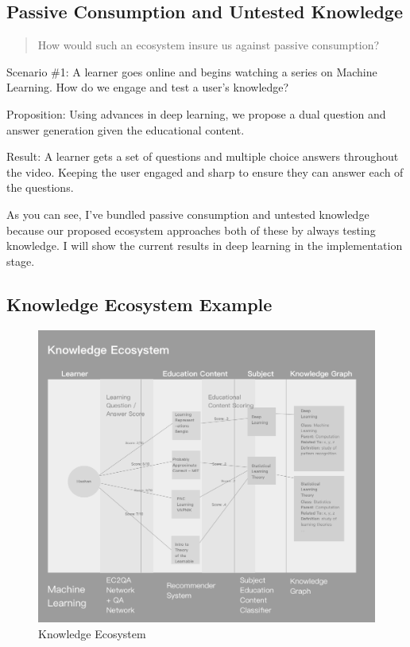 \documentclass{acm_proc_article-sp}
\begin{document}
\subsection{Passive Consumption and Untested
Knowledge}\label{passive-consumption-and-untested-knowledge}

\begin{quote}
How would such an ecosystem insure us against passive consumption?
\end{quote}

Scenario \#1: A learner goes online and begins watching a series on
Machine Learning. How do we engage and test a user's knowledge?

Proposition: Using advances in deep learning, we propose a dual question
and answer generation given the educational content.

Result: A learner gets a set of questions and multiple choice answers
throughout the video. Keeping the user engaged and sharp to ensure they
can answer each of the questions.

As you can see, I've bundled passive consumption and untested knowledge
because our proposed ecosystem approaches both of these by always
testing knowledge. I will show the current results in deep learning in
the implementation stage.

\subsection{Knowledge Ecosystem
Example}\label{knowledge-ecosystem-example}

\begin{figure}
\centering
\includegraphics{img/knowledgeEcosystem.png}
\caption{Knowledge Ecosystem}
\end{figure}
\end{document}
